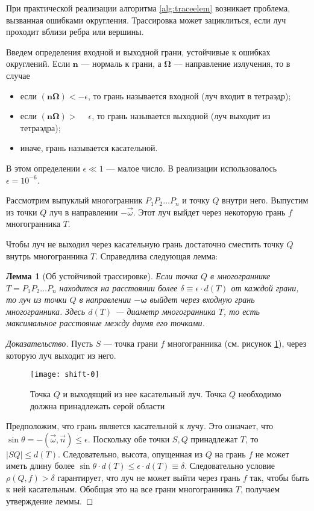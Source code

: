 При практической реализации алгоритма \ref{alg:traceelem} возникает проблема, вызванная ошибками округления. Трассировка может зациклиться, если луч проходит вблизи ребра или вершины.

Введем определения входной и выходной грани, устойчивые к ошибках округлений.
Если $\mathbf n$ --- нормаль к грани, а $\boldsymbol \Omega$ --- направление излучения, то в случае
\begin{itemize}
\item если $(\mathbf n \boldsymbol \Omega) < -\epsilon$, то грань называется входной (луч входит в тетраэдр);
\item если $(\mathbf n \boldsymbol \Omega) > \phantom{-}\epsilon$, то грань называется выходной (луч выходит из тетраэдра);
\item иначе, грань называется касательной.
\end{itemize}
В этом определении $\epsilon \ll 1$ --- малое число. В реализации использовалось $\epsilon = 10^{-6}$.

Рассмотрим выпуклый многогранник $P_1P_2\dots P_n$ и точку $Q$ внутри него. Выпустим из точки $Q$ 
луч в направлении $-\vec\omega$. Этот луч выйдет через некоторую грань $f$ многогранника $T$.

Чтобы луч не выходил через касательную грань достаточно сместить точку $Q$ внутрь многогранника 
$T$. Справедлива следующая лемма:
\newtheorem{lemma}{Лемма}
\begin{lemma}[Об устойчивой трассировке]
Если точка $Q$ в многограннике $T = P_1P_2\dots P_n$ находится на расстоянии более $\delta 
\equiv \epsilon \cdot d(T)$ от каждой грани, то луч из точки $Q$ в направлении
$-\boldsymbol \omega$ выйдет через входную грань многогранника. Здесь $d(T)$ --- диаметр 
многогранника $T$, то есть максимальное расстояние между двумя его точками.
\end{lemma}
\begin{proof}[Доказательство]
Пусть $S$ --- точка грани $f$ многогранника (см. рисунок \ref{fig:touch}), через которую луч выходит из него.
\begin{figure}[ht!]
\centering
\texttt{[image: shift-0]}
\caption{Точка $Q$ и выходящий из нее касательный луч. Точка $Q$ необходимо должна принадлежать 
серой области}
\label{fig:touch}
\end{figure}

Предположим, что грань является касательной к лучу. Это означает, что $\sin \theta = -(\vec \omega, 
\vec n) \leqslant \epsilon$. Поскольку обе точки $S,Q$ принадлежат $T$, то $|SQ| \leq d(T)$. 
Следовательно, высота, опущенная из $Q$ на грань $f$ не может иметь длину более $\sin \theta \cdot 
d(T) \leq \epsilon \cdot d(T) \equiv \delta$. Следовательно условие $\rho(Q, f) > \delta$ 
гарантирует, что луч не может выйти через грань $f$ так, чтобы быть к ней касательным. Обобщая это 
на все грани многогранника $T$, получаем утверждение леммы.
\end{proof}

